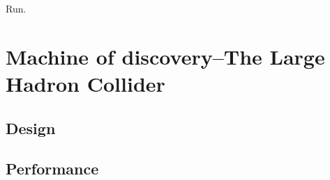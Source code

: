 \begin{savequote}[75mm]
Run.
\end{savequote}

\chapter{Machine of discovery--The Large Hadron Collider}

\section{Design}
\section{Performance}
